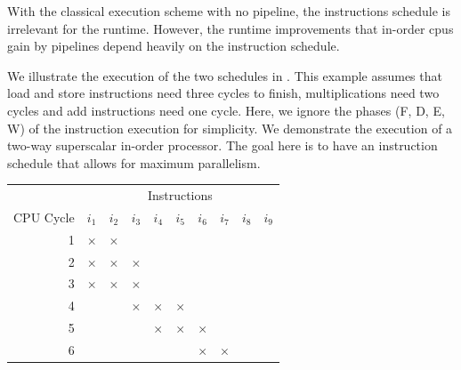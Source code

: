 With the classical execution scheme with no pipeline, the instructions schedule is irrelevant for the runtime.
However, the runtime improvements that in-order \acp{cpu} gain by pipelines depend heavily on the instruction schedule.

We illustrate the execution of the two schedules in .
This example assumes that load and store instructions need three cycles to finish, multiplications need two cycles and add instructions need one cycle.
Here, we ignore the phases (F, D, E, W) of the instruction execution for simplicity.
We demonstrate the execution of a two-way superscalar in-order processor.
The goal here is to have an instruction schedule that allows for maximum parallelism.
\begin{table}
    \scriptsize
    \begin{subtable}{0.48\textwidth}
        \begin{tabular}{rccccccccc} \toprule
            & \multicolumn{9}{c}{\fontsize{11pt}{9pt}\selectfont Instructions} \\
            \cmidrule{2-10}
            {\fontsize{11pt}{9pt}\selectfont CPU Cycle} & 
            {\fontsize{11pt}{9pt}\selectfont $i_1$} & 
            {\fontsize{11pt}{9pt}\selectfont $i_2$} & 
            {\fontsize{11pt}{9pt}\selectfont $i_3$} & 
            {\fontsize{11pt}{9pt}\selectfont $i_4$} & 
            {\fontsize{11pt}{9pt}\selectfont $i_5$} & 
            {\fontsize{11pt}{9pt}\selectfont $i_6$} & 
            {\fontsize{11pt}{9pt}\selectfont $i_7$} & 
            {\fontsize{11pt}{9pt}\selectfont $i_8$} & 
            {\fontsize{11pt}{9pt}\selectfont $i_9$} \\
            \midrule
             1 &$\boldsymbol{\times}$&$\boldsymbol{\times}$&   &   &   &   &   &   &   \\ \rowcolor[gray]{.975}
             2 &$\boldsymbol{\times}$&$\boldsymbol{\times}$&$\boldsymbol{\times}$&   &   &   &   &   &   \\
             3 &$\boldsymbol{\times}$&$\boldsymbol{\times}$&$\boldsymbol{\times}$&   &   &   &   &   &   \\ \rowcolor[gray]{.975}
             4 &   &   &$\boldsymbol{\times}$&$\boldsymbol{\times}$&$\boldsymbol{\times}$&   &   &   &   \\
             5 &   &   &   &$\boldsymbol{\times}$&$\boldsymbol{\times}$&$\boldsymbol{\times}$&   &   &   \\ \rowcolor[gray]{.975}
             6 &   &   &   &   &   &$\boldsymbol{\times}$&$\boldsymbol{\times}$&   &   \\

\end{tabular}
\end{subtable}
\end{table}
